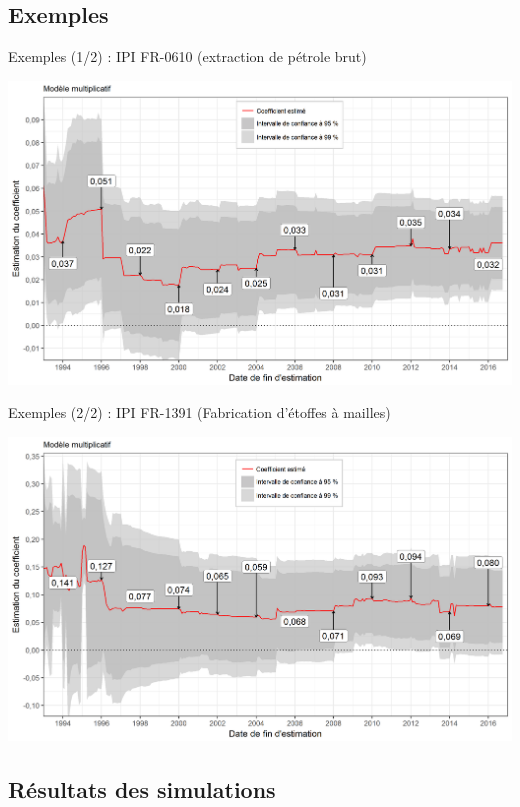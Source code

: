 \documentclass[10pt,xcolor=table,color={dvipsnames,usenames},ignorenonframetext,usepdftitle=false,french]{beamer}
\begin{document}
\subsection{Exemples}\label{exemples}

\begin{frame}{Exemples (1/2) : IPI FR-0610 (extraction de pétrole brut)}

\centering
\includegraphics[width = \textwidth]{img/LYexemple1.png}

\end{frame}

\begin{frame}{Exemples (2/2) : IPI FR-1391 (Fabrication d'étoffes à
mailles)}

\centering
\includegraphics[width = \textwidth]{img/LYexemple2.png}

\end{frame}

\subsection{Résultats des simulations}\label{resultats-des-simulations}
\end{document}
